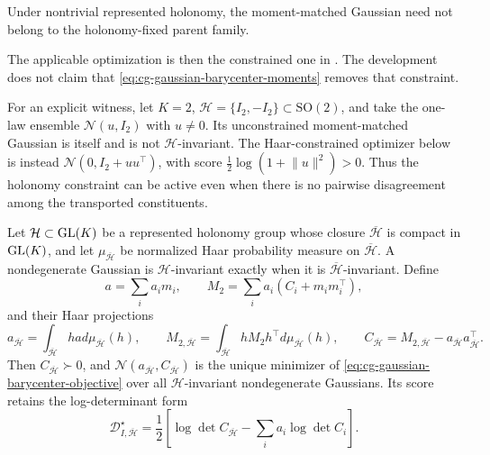 Under nontrivial represented holonomy, the moment-matched Gaussian need not
belong to the holonomy-fixed parent family. 

The
applicable optimization is then the constrained one in
. The development does not claim that
\eqref{eq:cg-gaussian-barycenter-moments} removes that constraint.

For an explicit witness, let \(K=2\),
\(\mathcal H=\{I_2,-I_2\}\subset\mathrm{SO}(2)\), and take the one-law
ensemble \(\mathcal N(u,I_2)\) with \(u\neq0\). Its unconstrained
moment-matched Gaussian is itself and is not \(\mathcal H\)-invariant. The
Haar-constrained optimizer below is instead
\(\mathcal N(0,I_2+uu^\top)\), with score
\(\tfrac12\log(1+\lVert u\rVert^2)>0\). Thus the holonomy constraint can be
active even when there is no pairwise disagreement among the transported
constituents.

Let \(\mathcal H\subset\mathrm{GL}(K)\) be a represented holonomy group whose closure
\(\overline{\mathcal H}\) is compact in \(\mathrm{GL}(K)\), and let
\(\mu_{\overline{\mathcal H}}\) be normalized Haar probability measure on
\(\overline{\mathcal H}\). A nondegenerate Gaussian is
\(\mathcal H\)-invariant exactly when it is
\(\overline{\mathcal H}\)-invariant. Define
\begin{equation}
a=\sum_i a_im_i,\qquad
M_2=\sum_i a_i(C_i+m_im_i^\top),
\label{eq:cg-gaussian-raw-moments}
\end{equation}
and their Haar projections
\begin{equation}
a_{\overline{\mathcal H}}
=\int_{\overline{\mathcal H}}ha
d\mu_{\overline{\mathcal H}}(h),\qquad
M_{2,\overline{\mathcal H}}
=\int_{\overline{\mathcal H}}hM_2h^\top
d\mu_{\overline{\mathcal H}}(h),\qquad
C_{\overline{\mathcal H}}
=M_{2,\overline{\mathcal H}}
-a_{\overline{\mathcal H}}a_{\overline{\mathcal H}}^\top.
\label{eq:cg-gaussian-haar-moments}
\end{equation}
Then \(C_{\overline{\mathcal H}}\succ0\), and
\(\mathcal N(a_{\overline{\mathcal H}},C_{\overline{\mathcal H}})\) is the unique minimizer of
\eqref{eq:cg-gaussian-barycenter-objective} over all
\(\mathcal H\)-invariant nondegenerate Gaussians. Its score retains the
log-determinant form
\begin{equation}
\mathcal D_{I,\overline{\mathcal H}}^\star
=\frac12\left[
\log\det C_{\overline{\mathcal H}}-\sum_i a_i\log\det C_i
\right].
\label{eq:cg-gaussian-haar-score}
\end{equation}

